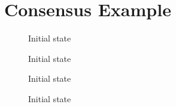 \chapter{Consensus Example}
\label{app:consensus-example}

\begin{figure}[htb]
    \centering
    \caption{Initial state}
    \label{fig:trustchain-1}
\end{figure}

\begin{figure}[htb]
    \centering
    \caption{Initial state}
    \label{fig:trustchain-2}
\end{figure}

\begin{figure}
    \centering
    \caption{Initial state}
    \label{fig:trustchain-3}
\end{figure}

\begin{figure}
    \centering
    \caption{Initial state}
    \label{fig:trustchain-4}
\end{figure}